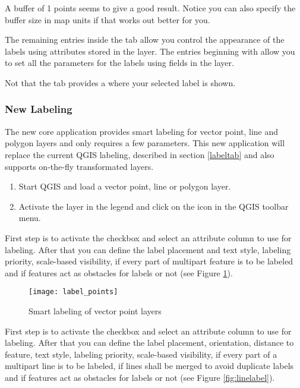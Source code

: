 A buffer of 1 points seems to give a good result.
Notice you can also specify the buffer size in map units if that works out
better for you.

The remaining entries inside the  tab allow you control the appearance of the
labels using attributes stored in the layer. The entries beginning with  allow you to
set all the parameters for the labels using fields in the layer.

Not that the  tab provides a  where your
selected label is shown.

\subsubsection{New Labeling}\label{newlabel}

The new  core application provides smart labeling
for vector point,  line and polygon layers and only requires a few parameters.
This new application will replace the current QGIS labeling, described in section
\ref{labeltab} and also supports on-the-fly transformated layers.


\begin{enumerate}
  \item Start QGIS and load a vector point, line or polygon layer.
  \item Activate the layer in the legend and click on the
   icon in the QGIS toolbar menu.
\end{enumerate}


First step is to activate the  checkbox and select an attribute
column to use for labeling. After that you can define the label placement and text style,
labeling priority, scale-based visibility, if every part of multipart feature is to be
labeled and if features act as obstacles for labels or not (see
Figure \ref{fig:pointlabel}).

\begin{figure}[ht]
\centering
   \texttt{[image: label\_points]}
   \caption{Smart labeling of vector point layers \nixcaption}\label{fig:pointlabel}
\end{figure}


First step is to activate the  checkbox and select an attribute
column to use for labeling. After that you can define the label placement, orientation,
distance to feature, text style, labeling priority, scale-based visibility, if every part
of a multipart line is to be labeled, if lines shall be merged to avoid duplicate labels
and if features act as obstacles for labels or not (see Figure \ref{fig:linelabel}).

